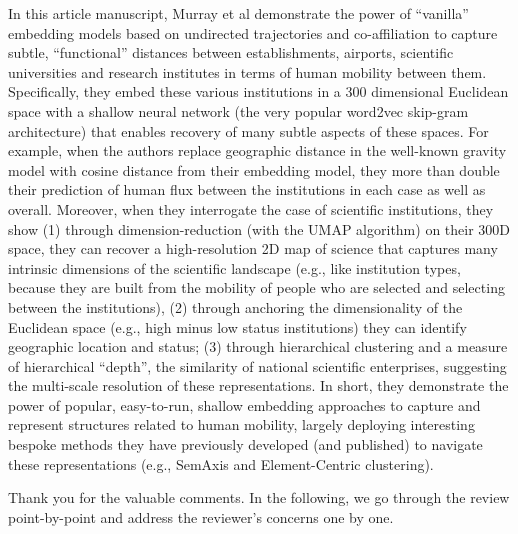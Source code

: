 \documentclass[12pt,a4paper]{article}
\newcommand{\response}[1]{{\leavevmode\noindent #1}}
\newcommand{\rcomment}[1]{%
\vspace{10pt}
\begin{tcolorbox}[colback=black!3,colframe=white!45!black]
#1
\end{tcolorbox}
}
\begin{document}
\rcomment{%
In this article manuscript, Murray et al demonstrate the power of “vanilla” embedding models based on undirected trajectories and co-affiliation to capture subtle, “functional” distances between establishments, airports, scientific universities and research institutes in terms of human mobility between them. Specifically, they embed these various institutions in a 300 dimensional Euclidean space with a shallow neural network (the very popular word2vec skip-gram architecture) that enables recovery of many subtle aspects of these spaces. For example, when the authors replace geographic distance in the well-known gravity model with cosine distance from their embedding model, they more than double their prediction of human flux between the institutions in each case as well as overall. Moreover, when they interrogate the case of scientific institutions, they show (1) through dimension-reduction (with the UMAP algorithm) on their 300D space, they can recover a high-resolution 2D map of science that captures many intrinsic dimensions of the scientific landscape (e.g., like institution types, because they are built from the mobility of people who are selected and selecting between the institutions), (2) through anchoring the dimensionality of the Euclidean space (e.g., high minus low status institutions) they can identify geographic location and status; (3) through hierarchical clustering and a measure of hierarchical “depth”, the similarity of national scientific enterprises, suggesting the multi-scale resolution of these representations. In short, they demonstrate the power of popular, easy-to-run, shallow embedding approaches to capture and represent structures related to human mobility, largely deploying interesting bespoke methods they have previously developed (and published) to navigate these representations (e.g., SemAxis and Element-Centric clustering).
}

\response{%
Thank you for the valuable comments. 
In the following, we go through the review point-by-point and address the reviewer's concerns one by one.
}
\end{document}
